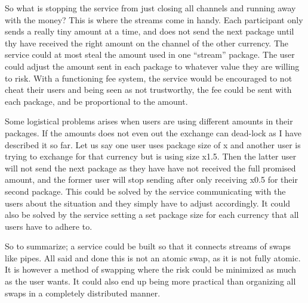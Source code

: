 So what is stopping the service from just closing all channels and running away with the money?
This is where the streams come in handy. Each participant only sends a really tiny amount at
a time, and does not send the next package until thy have received the right amount on the 
channel of the other currency. The service could at most steal the amount used in one 
\enquote{stream} package. The user could adjust the amount sent in each package to 
whatever value they are willing to risk. With a functioning fee system, the service would
be encouraged to not cheat their users and being seen as not trustworthy, the fee could be sent 
with each package, and be proportional to the amount.

Some logistical problems arises when users are using different amounts in their packages. 
If the amounts does not even out the exchange can dead-lock as I have described it so far. 
Let us say one user uses package size of x and another user is trying to exchange for that
currency but is using size x1.5. Then the latter user will not send the next package as 
they have have not received the full promised amount, and the former user will stop sending 
after only receiving x0.5 for their second package. This could be solved by the service 
communicating with the users about the situation and they simply have to adjust accordingly. 
It could also be solved by the service setting a set package size for each currency that
all users have to adhere to. 

So to summarize; a service could be built so that it connects streams of swaps like pipes. 
All said and done this is not an atomic swap, as it is not fully atomic. It is however a 
method of swapping where the risk could be minimized as much as the user wants. It could
also end up being more practical than organizing all swaps in a completely 
distributed manner.